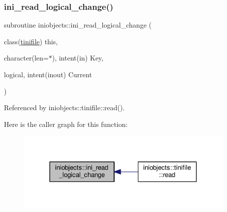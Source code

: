 \mbox{\label{namespaceiniobjects_a21e68c5f321b32ea2f6086c05c89af1a}} 
\subsubsection{\texorpdfstring{ini\+\_\+read\+\_\+logical\+\_\+change()}{ini\_read\_logical\_change()}}
{\footnotesize\ttfamily subroutine iniobjects\+::ini\+\_\+read\+\_\+logical\+\_\+change (\begin{DoxyParamCaption}\item[{class(\mbox{\hyperlink{structiniobjects_1_1tinifile}{tinifile}})}]{this,  }\item[{character(len=$\ast$), intent(in)}]{Key,  }\item[{logical, intent(inout)}]{Current }\end{DoxyParamCaption})\hspace{0.3cm}{\ttfamily [private]}}



Referenced by iniobjects\+::tinifile\+::read().

Here is the caller graph for this function\+:
\nopagebreak
\begin{figure}[H]
\begin{center}
\leavevmode
\includegraphics[width=304pt]{namespaceiniobjects_a21e68c5f321b32ea2f6086c05c89af1a_icgraph}
\end{center}
\end{figure}
\mbox{\label{namespaceiniobjects_a512c72d9b421e7832a796993523deaf4}} 
